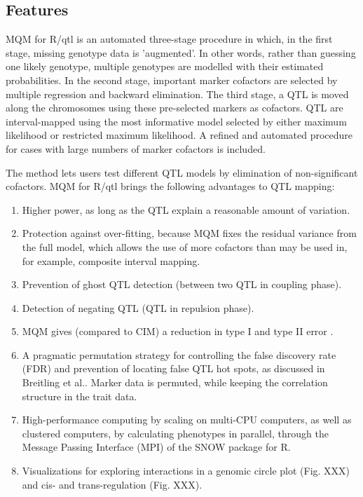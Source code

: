 \documentclass[8pt, twoside, a5paper]{report}
\begin{document}
\subsection{Features}
MQM for R/qtl is an automated three-stage procedure in which, in the first stage, missing genotype data is 'augmented'. 
In other words, rather than guessing one likely genotype, multiple genotypes are modelled with their estimated 
probabilities. In the second stage, important marker cofactors are selected by multiple regression and backward 
elimination. The third stage, a QTL is moved along the chromosomes using these pre-selected markers as cofactors. 
QTL are interval-mapped using the most informative model selected by either maximum likelihood or restricted maximum 
likelihood. A refined and automated procedure for cases with large numbers of marker cofactors is included. 

The method lets users test different QTL models by elimination of non-significant cofactors. MQM for R/qtl brings the 
following advantages to QTL mapping:
\begin{enumerate}\itemsep1pt
\item Higher power, as long as the QTL explain a reasonable amount of variation.
\item Protection against over-fitting, because MQM fixes the residual variance from the full model, which allows the 
use of more cofactors than may be used in, for example, composite interval mapping\cite{Zeng:1994}.
\item Prevention of ghost QTL detection (between two QTL in coupling phase).
\item Detection of negating QTL (QTL in repulsion phase). 
\item MQM gives (compared to CIM) a reduction in type I and type II error \cite{Handbook:Jansen:2007}.
\item A pragmatic permutation strategy for controlling the false discovery rate (FDR) and prevention of locating 
false QTL hot spots, as discussed in Breitling et al.\cite{Breitling:2008a}. Marker data is permuted, while keeping 
the correlation structure in the trait data.
\item High-performance computing by scaling on multi-CPU computers, as well as clustered computers, by calculating 
phenotypes in parallel, through the Message Passing Interface (MPI) of the SNOW package for R\cite{Tierney:2009}.
\item Visualizations for exploring interactions in a genomic circle plot (Fig. XXX) and cis- and trans-regulation (Fig. XXX).
\end{enumerate}
\end{document}
